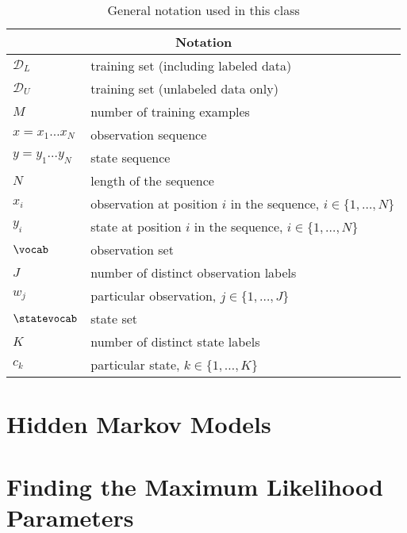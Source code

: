 \begin{table}[h]
\begin{center}
\begin{tabular}{|l|l|}
\hline
\multicolumn{2}{|c|}{Notation}\\
\hline
\hline
$\mathcal{D}_L$ & training set (including labeled data)\\
\hline
$\mathcal{D}_U$ & training set (unlabeled data only)\\
\hline
$M$  & number of training examples \\
\hline
$x = x_1 \ldots x_N$  & observation sequence \\
\hline
$y = y_1 \ldots y_N$  & state sequence \\
\hline

$N$  & length of the sequence \\
\hline
$x_i$ &  observation at position $i$ in the sequence, $i \in \{1,\ldots,N\}$\\
\hline
$y_i$ &  state at position $i$ in the sequence, $i \in \{1,\ldots,N\}$\\
\hline
$\vocab$ & observation set\\
\hline 
$J$ & number of distinct observation labels\\
\hline 
$w_j$ & particular observation, $j \in \{1,\ldots,J\}$\\
\hline 
$\statevocab$ & state set\\
\hline 
$K$ & number of distinct state labels\\
\hline 
$c_k$ & particular state, $k \in \{1,\ldots,K\}$\\
\hline  
\end{tabular}
\end{center}
\label{tab:hmm_notation}
\caption{General notation used in this class}
\end{table}


\section{\label{hmm} Hidden Markov Models}


\section{\label{ml} Finding the Maximum Likelihood Parameters}


